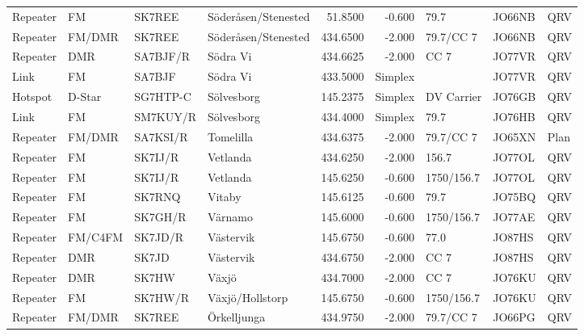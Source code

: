 \begin{landscape}
\begin{longtable}{llllrrlll}
	Repeater          & FM              & SK7REE   & Söderåsen/Stenested  &      51.8500 &     -0.600 & 79.7              & JO66NB      & QRV      \\
	Repeater          & FM/DMR          & SK7REE   & Söderåsen/Stenested  &     434.6500 &     -2.000 & 79.7/CC 7         & JO66NB      & QRV      \\
	Repeater          & DMR             & SA7BJF/R & Södra Vi             &     434.6625 &     -2.000 & CC 7              & JO77VR      & QRV      \\
	Link              & FM              & SA7BJF   & Södra Vi             &     433.5000 &    Simplex &                   & JO77VR      & QRV      \\
	Hotspot           & D-Star          & SG7HTP-C & Sölvesborg           &     145.2375 &    Simplex & DV Carrier        & JO76GB      & QRV      \\
	Link              & FM              & SM7KUY/R & Sölvesborg           &     434.4000 &    Simplex & 79.7              & JO76HB      & QRV      \\
	Repeater          & FM/DMR          & SA7KSI/R & Tomelilla            &     434.6375 &     -2.000 & 79.7/CC 7         & JO65XN      & Plan     \\
	Repeater          & FM              & SK7IJ/R  & Vetlanda             &     434.6250 &     -2.000 & 156.7             & JO77OL      & QRV      \\
	Repeater          & FM              & SK7IJ/R  & Vetlanda             &     145.6250 &     -0.600 & 1750/156.7        & JO77OL      & QRV      \\
	Repeater          & FM              & SK7RNQ   & Vitaby               &     145.6125 &     -0.600 & 79.7              & JO75BQ      & QRV      \\
	Repeater          & FM              & SK7GH/R  & Värnamo              &     145.6000 &     -0.600 & 1750/156.7        & JO77AE      & QRV      \\
	Repeater          & FM/C4FM         & SK7JD/R  & Västervik            &     145.6750 &     -0.600 & 77.0              & JO87HS      & QRV      \\
	Repeater          & DMR             & SK7JD    & Västervik            &     434.6750 &     -2.000 & CC 7              & JO87HS      & QRV      \\
	Repeater          & DMR             & SK7HW    & Växjö                &     434.7000 &     -2.000 & CC 7              & JO76KU      & QRV      \\
	Repeater          & FM              & SK7HW/R  & Växjö/Hollstorp      &     145.6750 &     -0.600 & 1750/156.7        & JO76KU      & QRV      \\
	Repeater          & FM/DMR          & SK7REE   & Örkelljunga          &     434.9750 &     -2.000 & 79.7/CC 7         & JO66PG      & QRV
\end{longtable}


\end{landscape}


